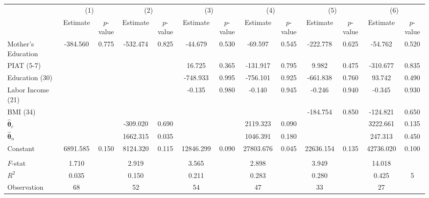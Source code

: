 \begin{tabular}{lcccccccccccc} \toprule
 & \multicolumn{2}{c}{(1)}  &  \multicolumn{2}{c}{(2)}  &  \multicolumn{2}{c}{(3)}  &  \multicolumn{2}{c}{(4)}  & \multicolumn{2}{c}{(5)} & \multicolumn{2}{c}{(6)} \\  
 & Estimate & $p$-value & Estimate & $p$-value & Estimate & $p$-value & Estimate & $p$-value & Estimate & $p$-value & Estimate & $p$-value \\ \midrule
Mother's Education &  -384.560 &     0.775 &  -532.474 &     0.825 &   -44.679 &     0.530 &   -69.597 &     0.545 &  -222.778 &     0.625 &   -54.762 &     0.520 \\  
PIAT (5-7) &         &         &         &         &    16.725 &     0.365 &  -131.917 &     0.795 &     9.982 &     0.475 &  -310.677 &     0.835 \\  
Education (30) &         &         &         &         &  -748.933 &     0.995 &  -756.101 &     0.925 &  -661.838 &     0.760 &    93.742 &     0.490 \\  
Labor Income (21) &         &         &         &         &    -0.135 &     0.980 &    -0.140 &     0.945 &    -0.246 &     0.940 &    -0.345 &     0.930 \\  
BMI (34)  &         &         &         &         &         &         &         &         &  -184.754 &     0.850 &  -124.821 &     0.650 \\  
$\hat{\bm{\theta}}_c$&         &         &  -309.020 &     0.690 &         &         &  2119.323 &     0.090 &         &         &  3222.661 &     0.135 \\  
$\hat{\bm{\theta}}_n$ &         &         &  1662.315 &     0.035 &         &         &  1046.391 &     0.180 &         &         &   247.313 &     0.450 \\  
Constant &  6891.585 &     0.150 &  8124.320 &     0.115 & 12846.299 &     0.090 & 27803.676 &     0.045 & 22636.154 &     0.135 & 42736.020 &     0.100 \\ \\ \midrule 
$F$-stat &     1.710 &      &     2.919 &      &     3.565 &    &     2.898 &      &     3.949 &      &    14.018 &      \\  
$R^2$ &     0.035 &     &     0.150 &     &     0.211 &     &     0.283 &     &     0.280 &      &     0.425 &     5 \\  
Observation &    68 &      &    52 &     &    54 &     &    47 &     &    33 &      &    27 &      \\  
\bottomrule \end{tabular}
